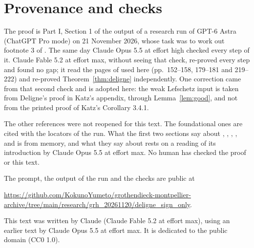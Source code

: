 \documentclass[11pt,a4paper]{article}
\theoremstyle{plain}
\theoremstyle{remark}
\begin{document}
\section*{Provenance and checks}

The proof is Part I, Section 1 of the output of a research run of GPT-6 Astra (ChatGPT Pro mode) on 21 November 2026,
whose task was to work out footnote 3 of \cite{Alpoge}. The same day Claude Opus 5.5 at effort high checked every
step of it. Claude Fable 5.2 at effort max, without seeing that check, re-proved every step and found no gap; it read
the pages of \cite{KatzACT} used here (pp.~152--158, 179--181 and 219--222) and re-proved
Theorem~\ref{thm:deligne} independently. One correction came from that second check and is adopted here: the weak
Lefschetz input is taken from Deligne's proof in Katz's appendix, through Lemma~\ref{lem:good}, and not from the
printed proof of Katz's Corollary 3.4.1.

The other references were not reopened for this text. The foundational ones are cited with the locators of the run.
What the first two sections say about \cite{Bombieri}, \cite{WeilI}, \cite{WeilII}, \cite{Kedlaya},
\cite{Lafforgue} and \cite{Laumon} is from memory, and what they say about \cite{Scholl} rests on a reading of its introduction by
Claude Opus 5.5 at effort max. No human has checked the proof or this text.

The prompt, the output of the run and the checks are public at

{\raggedright\smallskip\noindent\url{https://github.com/KokunoYumeto/grothendieck-montpellier-archive/tree/main/research/grh_20261120/deligne_sign_only}.\par}

\smallskip
This text was written by Claude (Claude Fable 5.2 at effort max), using an earlier text by Claude Opus 5.5 at effort
max. It is dedicated to the public domain (CC0 1.0).
\end{document}
